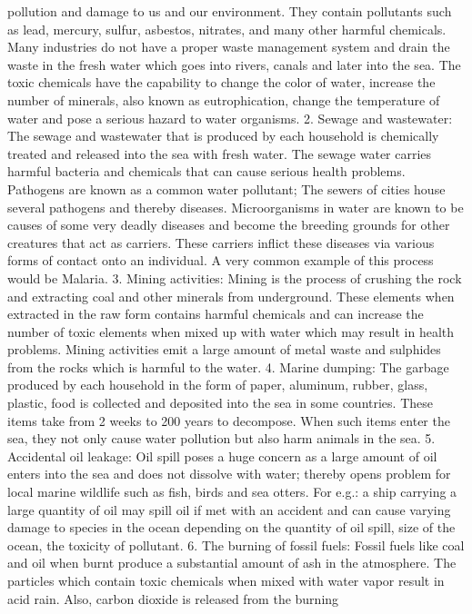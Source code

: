 pollution and damage to us and our environment. They contain
pollutants such as lead, mercury, sulfur, asbestos, nitrates, and many
other harmful chemicals.
Many industries do not have a proper waste management system and
drain the waste in the fresh water which goes into rivers, canals and
later into the sea. The toxic chemicals have the capability to change
the color of water, increase the number of minerals, also known as
eutrophication, change the temperature of water and pose a serious
hazard to water organisms.
2. Sewage and wastewater: The sewage and wastewater that is
produced by each household is chemically treated and released into
the sea with fresh water. The sewage water carries harmful
bacteria and chemicals that can cause serious health problems.
Pathogens are known as a common water pollutant; The sewers of
cities house several pathogens and thereby diseases.
Microorganisms in water are known to be causes of some very deadly
diseases and become the breeding grounds for other creatures that
act as carriers. These carriers inflict these diseases via various
forms of contact onto an individual. A very common example of this
process would be Malaria.
3. Mining activities: Mining is the process of crushing the rock and
extracting coal and other minerals from underground. These
elements when extracted in the raw form contains harmful
chemicals and can increase the number of toxic elements when
mixed up with water which may result in health problems. Mining
activities emit a large amount of metal waste and sulphides from the
rocks which is harmful to the water.
4. Marine dumping: The garbage produced by each household in the
form of paper, aluminum, rubber, glass, plastic, food is collected and
deposited into the sea in some countries. These items take from 2
weeks to 200 years to decompose. When such items enter the sea,
they not only cause water pollution but also harm animals in the sea.
5. Accidental oil leakage: Oil spill poses a huge concern as a large
amount of oil enters into the sea and does not dissolve with water;
thereby opens problem for local marine wildlife such as fish, birds
and sea otters. For e.g.: a ship carrying a large quantity of oil may
spill oil if met with an accident and can cause varying damage to
species in the ocean depending on the quantity of oil spill, size of the
ocean, the toxicity of pollutant.
6. The burning of fossil fuels: Fossil fuels like coal and oil when
burnt produce a substantial amount of ash in the atmosphere. The
particles which contain toxic chemicals when mixed with water vapor
result in acid rain. Also, carbon dioxide is released from the burning
